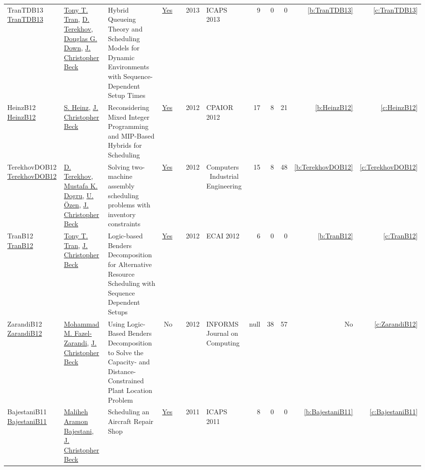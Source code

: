 {\begin{longtable}{>{\raggedright\arraybackslash}p{3cm}>{\raggedright\arraybackslash}p{6cm}>{\raggedright\arraybackslash}p{6.5cm}rrrp{2.5cm}rrrrr}
TranTDB13 \href{http://www.aaai.org/ocs/index.php/ICAPS/ICAPS13/paper/view/6005}{TranTDB13} & \hyperref[auth:a811]{Tony T. Tran}, \hyperref[auth:a830]{D. Terekhov}, \hyperref[auth:a815]{Douglas G. Down}, \hyperref[auth:a89]{J. Christopher Beck} & Hybrid Queueing Theory and Scheduling Models for Dynamic Environments with Sequence-Dependent Setup Times & \href{works/TranTDB13.pdf}{Yes} & \cite{TranTDB13} & 2013 & ICAPS 2013 & 9 & 0 & 0 & \ref{b:TranTDB13} & \ref{c:TranTDB13}\\
HeinzB12 \href{https://doi.org/10.1007/978-3-642-29828-8\_14}{HeinzB12} & \hyperref[auth:a134]{S. Heinz}, \hyperref[auth:a89]{J. Christopher Beck} & Reconsidering Mixed Integer Programming and MIP-Based Hybrids for Scheduling & \href{works/HeinzB12.pdf}{Yes} & \cite{HeinzB12} & 2012 & CPAIOR 2012 & 17 & 8 & 21 & \ref{b:HeinzB12} & \ref{c:HeinzB12}\\
TerekhovDOB12 \href{https://doi.org/10.1016/j.cie.2012.02.006}{TerekhovDOB12} & \hyperref[auth:a830]{D. Terekhov}, \hyperref[auth:a832]{Mustafa K. Dogru}, \hyperref[auth:a833]{U. {\"{O}}zen}, \hyperref[auth:a89]{J. Christopher Beck} & Solving two-machine assembly scheduling problems with inventory constraints & \href{works/TerekhovDOB12.pdf}{Yes} & \cite{TerekhovDOB12} & 2012 & Computers \  Industrial Engineering & 15 & 8 & 48 & \ref{b:TerekhovDOB12} & \ref{c:TerekhovDOB12}\\
TranB12 \href{https://doi.org/10.3233/978-1-61499-098-7-774}{TranB12} & \hyperref[auth:a811]{Tony T. Tran}, \hyperref[auth:a89]{J. Christopher Beck} & Logic-based Benders Decomposition for Alternative Resource Scheduling with Sequence Dependent Setups & \href{works/TranB12.pdf}{Yes} & \cite{TranB12} & 2012 & ECAI 2012 & 6 & 0 & 0 & \ref{b:TranB12} & \ref{c:TranB12}\\
ZarandiB12 \href{http://dx.doi.org/10.1287/ijoc.1110.0458}{ZarandiB12} & \hyperref[auth:a967]{Mohammad M. Fazel-Zarandi}, \hyperref[auth:a89]{J. Christopher Beck} & Using Logic-Based Benders Decomposition to Solve the Capacity- and Distance-Constrained Plant Location Problem & No & \cite{ZarandiB12} & 2012 & INFORMS Journal on Computing & null & 38 & 57 & No & \ref{c:ZarandiB12}\\
BajestaniB11 \href{http://aaai.org/ocs/index.php/ICAPS/ICAPS11/paper/view/2680}{BajestaniB11} & \hyperref[auth:a829]{Maliheh Aramon Bajestani}, \hyperref[auth:a89]{J. Christopher Beck} & Scheduling an Aircraft Repair Shop & \href{works/BajestaniB11.pdf}{Yes} & \cite{BajestaniB11} & 2011 & ICAPS 2011 & 8 & 0 & 0 & \ref{b:BajestaniB11} & \ref{c:BajestaniB11}\\

\end{longtable}}
